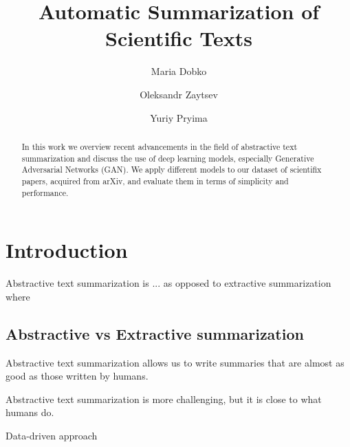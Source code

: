 \documentclass[sigplan]{acmart}
\begin{document}
\title{Automatic Summarization of Scientific Texts}

\author{Maria Dobko}

\author{Oleksandr Zaytsev}

\author{Yuriy Pryima}

\begin{abstract}

In this work we overview recent advancements in the field of abstractive text summarization and discuss the use of deep learning models, especially Generative Adversarial Networks (GAN). We apply different models to our dataset of scientifix papers, acquired from arXiv, and evaluate them in terms of simplicity and performance.

\end{abstract}


\maketitle

\section{Introduction}
Abstractive text summarization is ...
as opposed to extractive summarization where

\subsection{Abstractive vs Extractive summarization}

Abstractive text summarization allows us to write summaries that are almost as good as those written by humans.

Abstractive text summarization is more challenging, but it is close to what humans do.

Data-driven approach
\end{document}
